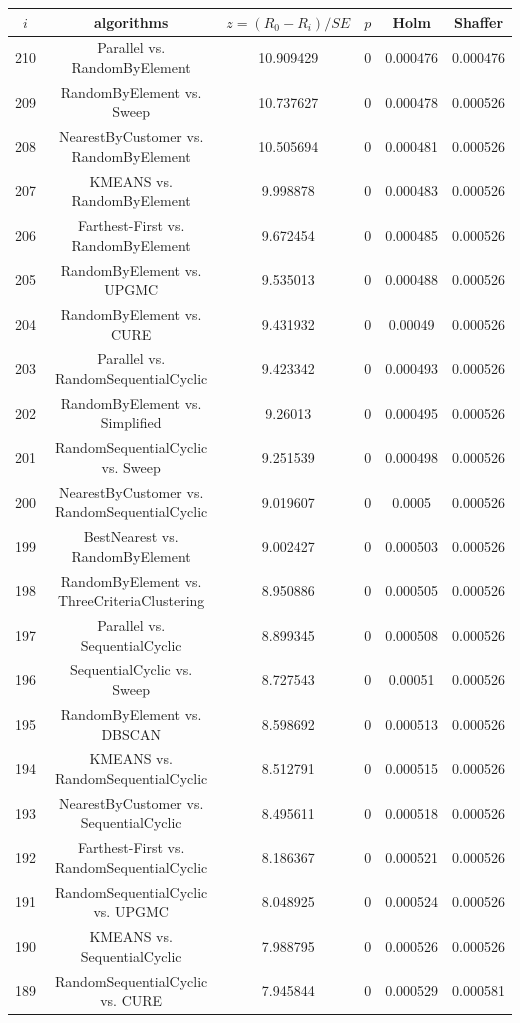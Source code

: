 \documentclass[a4paper,10pt]{article}
\begin{document}
\begin{landscape}
\begin{table}[!htp]
\centering\scriptsize
\begin{tabular}{cccccc}
$i$&algorithms&$z=(R_0 - R_i)/SE$&$p$&Holm&Shaffer\\
\hline210&Parallel vs. RandomByElement&10.909429&0&0.000476&0.000476\\
209&RandomByElement vs. Sweep&10.737627&0&0.000478&0.000526\\
208&NearestByCustomer vs. RandomByElement&10.505694&0&0.000481&0.000526\\
207&KMEANS vs. RandomByElement&9.998878&0&0.000483&0.000526\\
206&Farthest-First vs. RandomByElement&9.672454&0&0.000485&0.000526\\
205&RandomByElement vs. UPGMC&9.535013&0&0.000488&0.000526\\
204&RandomByElement vs. CURE&9.431932&0&0.00049&0.000526\\
203&Parallel vs. RandomSequentialCyclic&9.423342&0&0.000493&0.000526\\
202&RandomByElement vs. Simplified&9.26013&0&0.000495&0.000526\\
201&RandomSequentialCyclic vs. Sweep&9.251539&0&0.000498&0.000526\\
200&NearestByCustomer vs. RandomSequentialCyclic&9.019607&0&0.0005&0.000526\\
199&BestNearest vs. RandomByElement&9.002427&0&0.000503&0.000526\\
198&RandomByElement vs. ThreeCriteriaClustering&8.950886&0&0.000505&0.000526\\
197&Parallel vs. SequentialCyclic&8.899345&0&0.000508&0.000526\\
196&SequentialCyclic vs. Sweep&8.727543&0&0.00051&0.000526\\
195&RandomByElement vs. DBSCAN&8.598692&0&0.000513&0.000526\\
194&KMEANS vs. RandomSequentialCyclic&8.512791&0&0.000515&0.000526\\
193&NearestByCustomer vs. SequentialCyclic&8.495611&0&0.000518&0.000526\\
192&Farthest-First vs. RandomSequentialCyclic&8.186367&0&0.000521&0.000526\\
191&RandomSequentialCyclic vs. UPGMC&8.048925&0&0.000524&0.000526\\
190&KMEANS vs. SequentialCyclic&7.988795&0&0.000526&0.000526\\
189&RandomSequentialCyclic vs. CURE&7.945844&0&0.000529&0.000581\\

\end{tabular}
\end{table}
\end{landscape}
\end{document}
